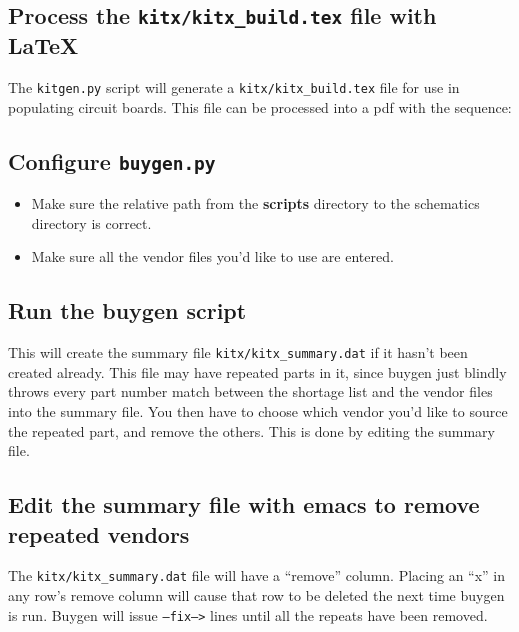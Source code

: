 
\subsection{Process the \texttt{kitx/kitx\_build.tex} file with \LaTeX}
The \texttt{kitgen.py} script will generate a \texttt{kitx/kitx\_build.tex} file for use in populating circuit boards.  This file can be processed into a pdf with the sequence:

\subsection{Configure \texttt{buygen.py}}
    \begin{itemize}
        \item Make sure the relative path from the \textbf{scripts} directory to the schematics directory is correct.
        \item Make sure all the vendor files you'd like to use are entered.
    \end{itemize}
            {}

\subsection{Run the buygen script}
This will create the summary file \texttt{kitx/kitx\_summary.dat} if it hasn't been created already.  This file may have repeated parts in it, since buygen just blindly throws every part number match between the shortage list and the vendor files into the summary file.  You then have to choose which vendor you'd like to source the repeated part, and remove the others.  This is done by editing the summary file.

\subsection[Edit the summary file]{Edit the summary file with emacs to remove repeated vendors}
The \texttt{kitx/kitx\_summary.dat} file will have a ``remove'' column.  Placing an ``x'' in any row's remove column will cause that row to be deleted the next time buygen is run.  Buygen will issue \texttt{--fix-->} lines until all the repeats have been removed.
